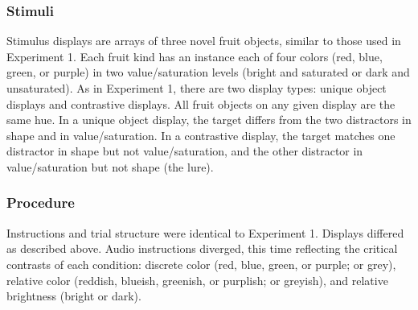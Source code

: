 \documentclass[10pt, letterpaper]{article}
\begin{document}
\hypertarget{stimuli}{%
\subsubsection{Stimuli}\label{stimuli}}

Stimulus displays are arrays of three novel fruit objects, similar to
those used in Experiment 1. Each fruit kind has an instance each of four
colors (red, blue, green, or purple) in two value/saturation levels
(bright and saturated or dark and unsaturated). As in Experiment 1,
there are two display types: unique object displays and contrastive
displays. All fruit objects on any given display are the same hue. In a
unique object display, the target differs from the two distractors in
shape and in value/saturation. In a contrastive display, the target
matches one distractor in shape but not value/saturation, and the other
distractor in value/saturation but not shape (the lure).

\hypertarget{procedure}{%
\subsubsection{Procedure}\label{procedure}}

Instructions and trial structure were identical to Experiment 1.
Displays differed as described above. Audio instructions diverged, this
time reflecting the critical contrasts of each condition: discrete color
(red, blue, green, or purple; or grey), relative color (reddish,
blueish, greenish, or purplish; or greyish), and relative brightness
(bright or dark).
\end{document}
